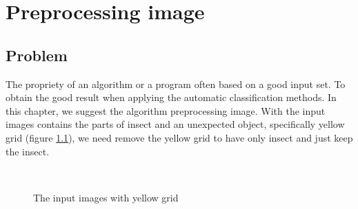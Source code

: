 \chapter{Preprocessing image}
\section{Problem}
The propriety of an algorithm or a program often based on a good input set. To obtain the good result when applying the automatic classification methods. In this chapter, we suggest the algorithm preprocessing image. With the input images contains the parts of insect and an unexpected object, specifically yellow grid (figure \ref{fig:figure_31}), we need remove the yellow grid to have only insect and just keep the insect.
\begin{figure}[h!]
\centering
{}~~
\caption{The input images with yellow grid}
\label{fig:figure_31}
\end{figure}
